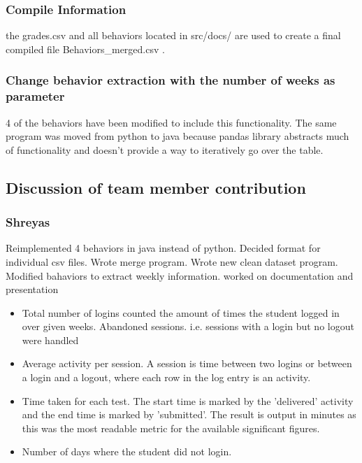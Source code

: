 \documentclass[12pt]{article}
\begin{document}
	\subsubsection{Compile Information}
	the grades.csv and all behaviors located in src/docs/ are used to create a final compiled file Behaviors\_merged.csv .
	
	\subsubsection{Change behavior extraction with the number of weeks as parameter}
	4 of the behaviors have been modified to include this functionality. The same program was moved from python to java because pandas library abstracts much of functionality and doesn't provide a way to iteratively go over the table.
	\subsection{Discussion of team member contribution}
	\subsubsection{Shreyas}
	Reimplemented 4 behaviors in java instead of python. Decided format for individual csv files. Wrote merge program. Wrote new clean dataset program. Modified bahaviors to extract weekly information. worked on documentation and presentation
	
	\begin{itemize}
		\item Total number of logins counted the amount of times the student logged in over given weeks. Abandoned sessions. i.e. sessions with a login but no logout were handled
		\item Average activity per session. A session is time between two logins or between a login and a logout, where each row in the log entry is an activity.
		\item Time taken for each test. The start time is marked by the 'delivered' activity and the end time is marked by 'submitted'. The result is output in minutes as this was the most readable metric for the available significant figures.
		\item Number of days where the student did not login. 
	\end{itemize}
	
\end{document}
